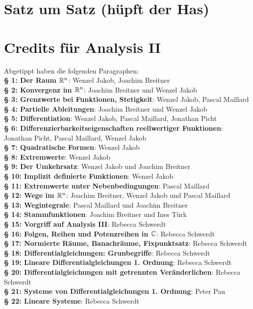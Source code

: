 \documentclass[a4paper,twoside,DIV15,BCOR12mm,chapterprefix=true,headings=twolinechapter]{scrbook}
\begin{document}
\appendix
\chapter{Satz um Satz (hüpft der Has)}

\renewcommand{\indexname}{Stichwortverzeichnis}
\printindex

\chapter{Credits für Analysis II} Abgetippt haben die folgenden Paragraphen:\\%
\textbf{§ 1: Der Raum $\mathbb{R}^n$}: Wenzel Jakob, Joachim Breitner\\
\textbf{§ 2: Konvergenz im $\mathbb{R}^n$}: Joachim Breitner und Wenzel Jakob\\
\textbf{§ 3: Grenzwerte bei Funktionen, Stetigkeit}: Wenzel Jakob, Pascal Maillard\\
\textbf{§ 4: Partielle Ableitungen}: Joachim Breitner und Wenzel Jakob\\
\textbf{§ 5: Differentiation}: Wenzel Jakob, Pascal Maillard, Jonathan Picht\\
\textbf{§ 6: Differenzierbarkeitseigenschaften reellwertiger Funktionen}: Jonathan Picht, Pascal Maillard, Wenzel Jakob\\
\textbf{§ 7: Quadratische Formen}: Wenzel Jakob\\
\textbf{§ 8: Extremwerte}: Wenzel Jakob\\
\textbf{§ 9: Der Umkehrsatz}: Wenzel Jakob und Joachim Breitner\\
\textbf{§ 10: Implizit definierte Funktionen}: Wenzel Jakob\\
\textbf{§ 11: Extremwerte unter Nebenbedingungen}: Pascal Maillard\\
\textbf{§ 12: Wege im $\mathbb{R}^n$}: Joachim Breitner, Wenzel Jakob und Pascal Maillard\\
\textbf{§ 13: Wegintegrale}: Pascal Maillard und Joachim Breitner\\
\textbf{§ 14: Stammfunktionen}: Joachim Breitner und Ines Türk\\
\textbf{§ 15: Vorgriff auf Analysis III}: Rebecca Schwerdt\\
\textbf{§ 16: Folgen, Reihen und Potenzreihen in $\mathbb{C}$}: Rebecca Schwerdt\\
\textbf{§ 17: Normierte Räume, Banachräume, Fixpunktsatz}: Rebecca Schwerdt\\
\textbf{§ 18: Differentialgleichungen: Grunbegriffe}: Rebecca Schwerdt\\
\textbf{§ 19: Lineare Differentialgleichungen 1. Ordnung}: Rebecca Schwerdt\\
\textbf{§ 20: Differentialgleichungen mit getrennten Veränderlichen}: Rebecca Schwerdt\\
\textbf{§ 21: Systeme von Differentialgleichungen 1. Ordnung}: Peter Pan\\
\textbf{§ 22: Lineare Systeme}: Rebecca Schwerdt
\end{document}

